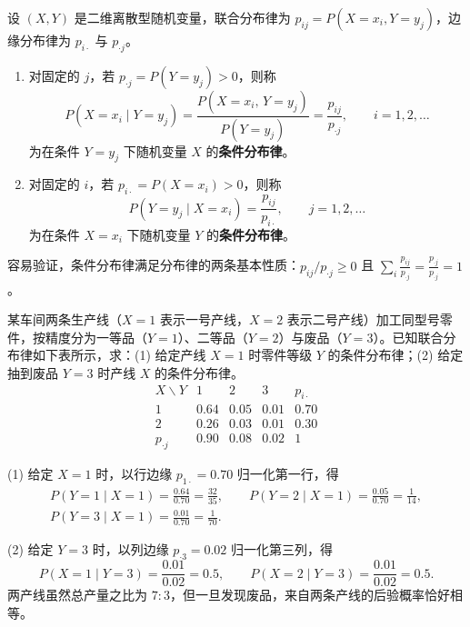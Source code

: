 \begin{definition}[离散型条件分布律]
\label{def:discrete-conditional}
设 $(X,Y)$ 是二维离散型随机变量，联合分布律为 $p_{ij}=P(X=x_i,Y=y_j)$，边缘分布律为 $p_{i\cdot}$ 与 $p_{\cdot j}$。
\begin{enumerate}
  \item 对固定的 $j$，若 $p_{\cdot j}=P(Y=y_j)>0$，则称
  \begin{equation}
    P(X=x_i\mid Y=y_j)=\frac{P(X=x_i,\,Y=y_j)}{P(Y=y_j)}=\frac{p_{ij}}{p_{\cdot j}},\qquad i=1,2,\ldots
    \label{eq:discrete-cond-x}
  \end{equation}
  为在条件 $Y=y_j$ 下随机变量 $X$ 的\textbf{条件分布律}。
  \item 对固定的 $i$，若 $p_{i\cdot}=P(X=x_i)>0$，则称
  \begin{equation}
    P(Y=y_j\mid X=x_i)=\frac{p_{ij}}{p_{i\cdot}},\qquad j=1,2,\ldots
    \label{eq:discrete-cond-y}
  \end{equation}
  为在条件 $X=x_i$ 下随机变量 $Y$ 的\textbf{条件分布律}。
\end{enumerate}
\end{definition}

容易验证，条件分布律满足分布律的两条基本性质：$p_{ij}/p_{\cdot j}\ge 0$ 且 $\sum_{i}\frac{p_{ij}}{p_{\cdot j}}=\frac{p_{\cdot j}}{p_{\cdot j}}=1$。

\begin{example}[title={两条生产线零件分级的双向条件分布}]
\label{eg:robot-conditional}
某车间两条生产线（$X=1$ 表示一号产线，$X=2$ 表示二号产线）加工同型号零件，按精度分为一等品（$Y=1$）、二等品（$Y=2$）与废品（$Y=3$）。已知联合分布律如下表所示，求：(1) 给定产线 $X=1$ 时零件等级 $Y$ 的条件分布律；(2) 给定抽到废品 $Y=3$ 时产线 $X$ 的条件分布律。
\[
\begin{array}{c|ccc|c}
  X\backslash Y & 1 & 2 & 3 & p_{i\cdot} \\ \hline
  1 & 0.64 & 0.05 & 0.01 & 0.70 \\
  2 & 0.26 & 0.03 & 0.01 & 0.30 \\ \hline
  p_{\cdot j} & 0.90 & 0.08 & 0.02 & 1
\end{array}
\]
\begin{solution}
(1) 给定 $X=1$ 时，以行边缘 $p_{1\cdot}=0.70$ 归一化第一行，得
\[
  \begin{gathered}
    P(Y=1\mid X=1)=\frac{0.64}{0.70}=\frac{32}{35},\qquad
    P(Y=2\mid X=1)=\frac{0.05}{0.70}=\frac{1}{14},\\
    P(Y=3\mid X=1)=\frac{0.01}{0.70}=\frac{1}{70}.
  \end{gathered}
\]

(2) 给定 $Y=3$ 时，以列边缘 $p_{\cdot 3}=0.02$ 归一化第三列，得
\[
  P(X=1\mid Y=3)=\frac{0.01}{0.02}=0.5,\qquad
  P(X=2\mid Y=3)=\frac{0.01}{0.02}=0.5.
\]
两产线虽然总产量之比为 $7:3$，但一旦发现废品，来自两条产线的后验概率恰好相等。
\end{solution}
\end{example}

